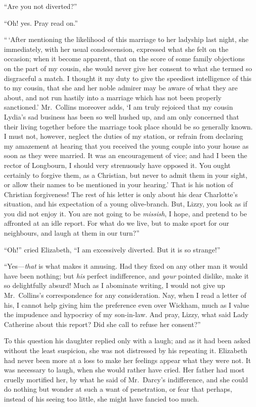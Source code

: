 ``Are you not diverted?''

``Oh! yes.  Pray read on.''

``\,`After mentioning the likelihood of this marriage to her ladyship
last night, she immediately, with her usual condescension,
expressed what she felt on the occasion; when it become apparent,
that on the score of some family objections on the part of my
cousin, she would never give her consent to what she termed so
disgraceful a match.  I thought it my duty to give the speediest
intelligence of this to my cousin, that she and her noble
admirer may be aware of what they are about, and not run
hastily into a marriage which has not been properly sanctioned.'
Mr.\ Collins moreover adds, `I am truly rejoiced that my cousin
Lydia's sad business has been so well hushed up, and am only
concerned that their living together before the marriage took
place should be so generally known.  I must not, however,
neglect the duties of my station, or refrain from declaring my
amazement at hearing that you received the young couple into
your house as soon as they were married.  It was an encouragement
of vice; and had I been the rector of Longbourn, I should very
strenuously have opposed it.  You ought certainly to forgive them,
as a Christian, but never to admit them in your sight, or allow
their names to be mentioned in your hearing.'  That is his notion
of Christian forgiveness!  The rest of his letter is only about
his dear Charlotte's situation, and his expectation of a young
olive-branch.  But, Lizzy, you look as if you did not enjoy it.
You are not going to be \emph{missish}, I hope, and pretend to be
affronted at an idle report.  For what do we live, but to make
sport for our neighbours, and laugh at them in our turn?''

``Oh!'' cried Elizabeth, ``I am excessively diverted.  But it is
so strange!''

``Yes---\emph{that} is what makes it amusing.  Had they fixed on any other
man it would have been nothing; but \emph{his} perfect indifference,
and \emph{your} pointed dislike, make it so delightfully absurd!  Much
as I abominate writing, I would not give up Mr.\ Collins's
correspondence for any consideration.  Nay, when I read a letter
of his, I cannot help giving him the preference even over Wickham,
much as I value the impudence and hypocrisy of my son-in-law.
And pray, Lizzy, what said Lady Catherine about this report?
Did she call to refuse her consent?''

To this question his daughter replied only with a laugh; and
as it had been asked without the least suspicion, she was not
distressed by his repeating it.  Elizabeth had never been
more at a loss to make her feelings appear what they were not.
It was necessary to laugh, when she would rather have cried.
Her father had most cruelly mortified her, by what he said of
Mr.\ Darcy's indifference, and she could do nothing but wonder
at such a want of penetration, or fear that perhaps, instead
of his seeing too little, she might have fancied too much.



